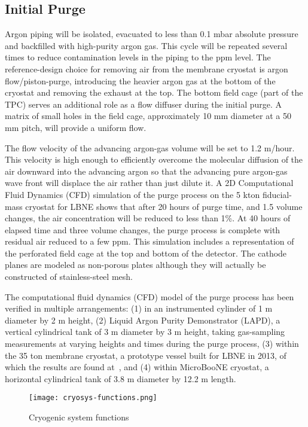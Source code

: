 \subsection{Initial Purge} 

Argon piping will be isolated, evacuated to less than 0.1 mbar
absolute pressure and backfilled with high-purity argon gas.
This cycle will be repeated several times to reduce contamination
levels in the piping to the ppm level. The reference-design choice
for removing air from the membrane cryostat is argon
flow/piston-purge, introducing the heavier argon gas at the
bottom of the cryostat and removing the exhaust at the top. The bottom
field cage (part of the TPC) serves an additional role as a flow
diffuser during the initial purge. A matrix of small holes in the
field cage, approximately 10 mm diameter at a 50 mm pitch,
will provide a uniform flow.

The flow velocity of the advancing argon-gas volume will be set to 1.2 m/hour.
This velocity is high enough to efficiently overcome the molecular diffusion
of the air downward into the advancing argon so that the advancing pure
argon-gas wave front will displace the air rather than just dilute it.
A 2D Computational Fluid Dynamics (CFD) simulation of the purge process
on the 5 kton fiducial-mass cryostat for LBNE shows that after 20 hours
of purge time, and 1.5 volume changes, the air concentration will be
reduced to less than 1\%. At 40 hours of elapsed time and three volume
changes, the purge process is complete with residual air reduced to a
few ppm. This simulation includes a representation of the perforated
field cage at the top and bottom of the detector.  The cathode planes
are modeled as non-porous plates although they will actually be
constructed of stainless-steel mesh.

The computational fluid dynamics (CFD) model of the purge process 
has been verified in multiple arrangements: (1) in an instrumented 
cylinder of 1 m diameter by 2 m height, (2) Liquid Argon Purity 
Demonstrator (LAPD), a vertical cylindrical tank of 3 m diameter by 3 m height,
taking gas-sampling measurements at varying heights and times during 
the purge process, (3) within the 35 ton membrane cryostat, a 
prototype vessel built for LBNE in 2013, of which the results 
are found at~\cite{Montanari:2013/06/13aqa}, %
and (4) within MicroBooNE cryostat, a horizontal cylindrical
tank of 3.8 m diameter by 12.2 m length.

\begin{figure}[htbp]
\centering
\texttt{[image: cryosys-functions.png]} 
\caption{Cryogenic system functions}
\label{fig:v5ch2-LBNF-block-diagram-2014}
\end{figure}

